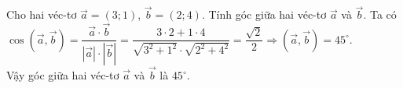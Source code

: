 \begin{bt}%
Cho hai véc-tơ $\overrightarrow{a}=(3;1)$, $\overrightarrow{b}=(2;4)$. Tính góc giữa hai véc-tơ $\overrightarrow{a}$ và $\overrightarrow{b}$.
\loigiai
{
Ta có $\cos \left(\overrightarrow{a},\overrightarrow{b}\right)=\dfrac{\overrightarrow{a}\cdot\overrightarrow{b}}{\left|\overrightarrow{a}\right|\cdot\left|\overrightarrow{b}\right|}=\dfrac{3\cdot2+1\cdot4}{\sqrt{3^2+1^2}\cdot\sqrt{2^2+4^2}}=\dfrac {\sqrt 2}{2} \Rightarrow \left(\overrightarrow{a},\overrightarrow{b}\right)=45^{\circ}$. \\
Vậy góc giữa hai véc-tơ $\overrightarrow{a}$ và $\overrightarrow{b}$ là $45^{\circ}$.
}
\end{bt}
